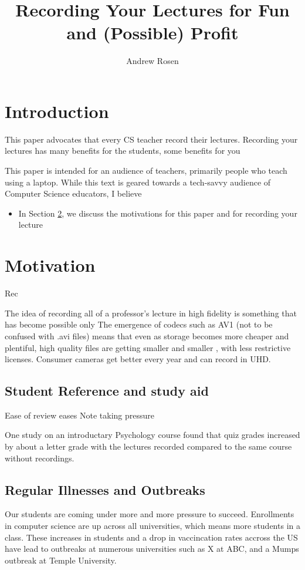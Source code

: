 \documentclass[sigconf]{acmart}
\title{Recording Your Lectures for Fun and (Possible) Profit}
\author{Andrew Rosen}
\affiliation{\institution{Temple University}}
\begin{document}
\maketitle



\section{Introduction}


This paper advocates that every CS teacher record their lectures.
Recording your lectures has many benefits for the students, some benefits for you \cite{Nobody06}

This paper is intended for an audience of teachers, primarily people who teach using a laptop.
While this text is geared towards a tech-savvy audience of Computer Science educators, I believe 




\begin{itemize}
	\item In Section \ref{why}, we discuss the motivations for this paper and for recording your lecture
\end{itemize}
\section{Motivation}
\label{why}
Rec


The idea of recording all of a professor's lecture in high fidelity is something that has become possible only 
The emergence of codecs such as AV1 (not to be confused with .avi files) means that even as storage becomes more cheaper and plentiful, high quality files are getting smaller and smaller \cite{AV1comp}, with less restrictive licenses. 
Consumer cameras get better every year and can record in UHD.


\subsection{Student Reference and study aid}


Ease of review
eases Note taking pressure


One study \cite{shimoff2001effects}  on an introductary Psychology course found that quiz grades increased by about a letter grade with the lectures recorded compared to the same course without recordings.

\subsection{Regular Illnesses and Outbreaks}
Our students are coming under more and more pressure to succeed.  
Enrollments in computer science are up across all universities, which means more students in a class. 
These increases in students and a drop in vaccincation rates accross the US have lead to outbreaks at numerous universities such as X at ABC, and a Mumps outbreak at Temple University.
\end{document}
